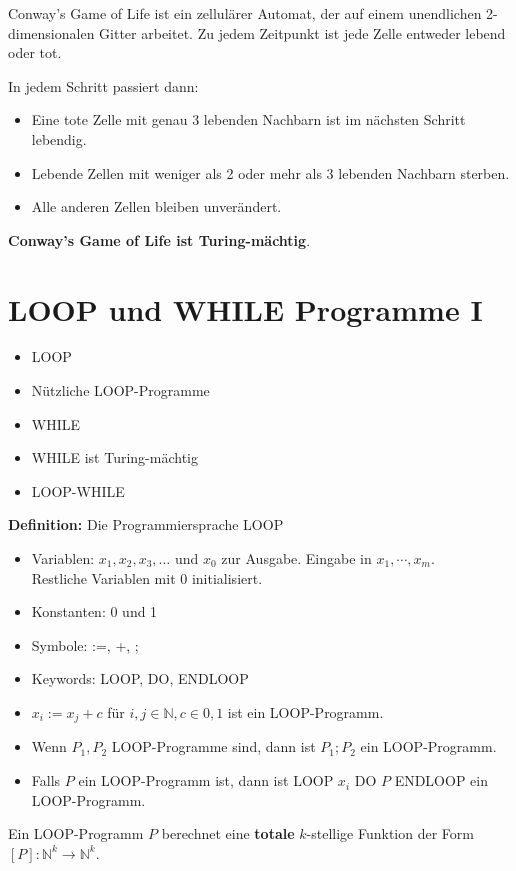 \documentclass[a4paper,graphics,11pt]{article}
\begin{document}
Conway's Game of Life ist ein zellulärer Automat, der auf einem unendlichen 2-dimensionalen Gitter
arbeitet. Zu jedem Zeitpunkt ist jede Zelle entweder lebend oder tot.

In jedem Schritt passiert dann:
\begin{itemize}
    \item Eine tote Zelle mit genau 3 lebenden Nachbarn ist im nächsten Schritt lebendig.
    \item Lebende Zellen mit weniger als 2 oder mehr als 3 lebenden Nachbarn sterben.
    \item Alle anderen Zellen bleiben unverändert.
\end{itemize}

\textbf{Conway's Game of Life ist Turing-mächtig}.



\newpage



\section{LOOP und WHILE Programme I}
\begin{itemize}
    \item LOOP
    \item Nützliche LOOP-Programme
    \item WHILE
    \item WHILE ist Turing-mächtig
    \item LOOP-WHILE
\end{itemize}

\textbf{Definition:} Die Programmiersprache LOOP
\begin{itemize}
    \item Variablen: $x_1,x_2,x_3,\dots$ und $x_0$ zur Ausgabe.
        Eingabe in $x_1,\cdots,x_m$.\\
        Restliche Variablen mit 0 initialisiert.
    \item Konstanten: 0 und 1
    \item Symbole: :=, +, ;
    \item Keywords: LOOP, DO, ENDLOOP
    \\
    \item $x_i := x_j + c$ für $i,j \in \mathbb{N}, c\in {0,1}$ ist ein LOOP-Programm.
    \item Wenn $P_1,P_2$ LOOP-Programme sind, dann ist $P_1;P_2$ ein LOOP-Programm.
    \item Falls $P$ ein LOOP-Programm ist, dann ist LOOP $x_i$ DO $P$ ENDLOOP ein LOOP-Programm.
\end{itemize}
Ein LOOP-Programm $P$ berechnet eine \textbf{totale} $k$-stellige Funktion der Form
$[P] : \mathbb{N}^k \to \mathbb{N}^k$.
\end{document}
